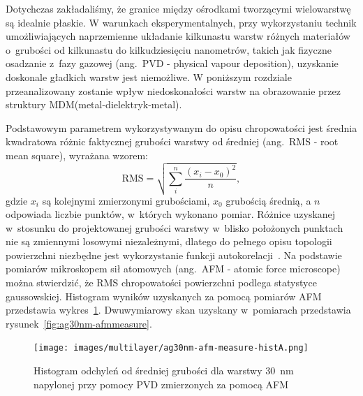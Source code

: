 Dotychczas zakładaliśmy, że granice między ośrodkami tworzącymi wielowarstwę są idealnie płaskie. W warunkach eksperymentalnych, przy wykorzystaniu technik umożliwiających naprzemienne układanie kilkunastu warstw różnych materiałów o~grubości od kilkunastu do kilkudziesięciu nanometrów,  takich jak fizyczne osadzanie z~fazy gazowej (ang.~PVD - physical vapour deposition), uzyskanie doskonale gładkich warstw jest niemożliwe. W poniższym rozdziale przeanalizowany zostanie wpływ niedoskonałości warstw na obrazowanie przez struktury MDM(metal-dielektryk-metal).

Podstawowym parametrem wykorzystywanym do opisu chropowatości jest średnia kwadratowa różnic faktycznej grubości warstwy od średniej (ang.~RMS - root mean square), wyrażana wzorem:
\begin{equation}
\textrm{RMS}=\sqrt{\sum_i^n \frac{(x_i -x_0)^2}{n}},
\end{equation}
gdzie $x_i$ są kolejnymi zmierzonymi grubościami, $x_0$ grubością średnią, a $n$ odpowiada liczbie punktów, w~których wykonano pomiar. Różnice uzyskanej w~stosunku do projektowanej grubości warstwy w~blisko położonych punktach nie są zmiennymi losowymi niezależnymi, dlatego do pełnego opisu topologii powierzchni niezbędne jest wykorzystanie funkcji autokorelacji~\cite{stefaniuk2011effect}. Na podstawie pomiarów mikroskopem sił atomowych (ang.~AFM - atomic force microscope) można stwierdzić, że RMS chropowatości powierzchni podlega statystyce gaussowskiej. Histogram wyników uzyskanych za pomocą pomiarów AFM przedstawia wykres~\ref{fig:ag30nm-afmhist}. Dwuwymiarowy skan uzyskany w~pomiarach przedstawia rysunek~\ref{fig:ag30nm-afmmeasure}.

\begin{figure}[bt]
		\texttt{[image: images/multilayer/ag30nm-afm-measure-histA.png]}
		\caption{Histogram odchyleń od średniej grubości dla warstwy $30$~nm napylonej przy pomocy PVD zmierzonych za pomocą AFM} 		\label{fig:ag30nm-afmhist}
\end{figure}

